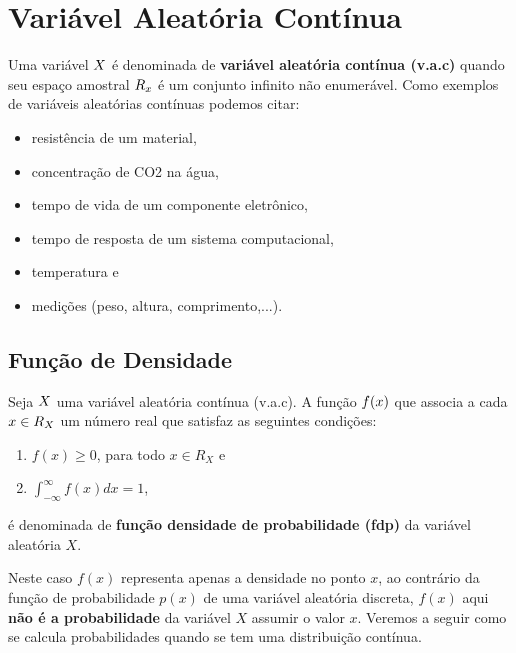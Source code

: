\documentclass[11pt]{article}
\begin{document}
\begin{flushleft}
\tableofcontents
\end{flushleft}


\justify

\section{Variável Aleatória Contínua} Uma variável $\mathnormal{X}$ é denominada de \textbf{variável aleatória contínua (v.a.c)} quando seu espaço amostral $\mathnormal{ R_x }$ é um conjunto infinito não enumerável. 
Como exemplos de variáveis aleatórias contínuas podemos citar:

\begin{itemize}
    \item resistência de um material,
    \item concentração de CO2 na água,
    \item tempo de vida de um componente eletrônico,
    \item tempo de resposta de um sistema computacional,
    \item temperatura e
    \item medições (peso, altura, comprimento,...).
\end{itemize}

\subsection{Função de Densidade}
Seja $\mathnormal{X}$ uma variável aleatória contínua (v.a.c). A função $\mathnormal{f(x)}$ que associa a cada $\mathnormal{x \in R_X}$ um número real que satisfaz as seguintes condições:
\begin{enumerate}
    \item $ f(x) \geqslant 0 $, para todo $ x \in R_X $ e
    \item $\displaystyle\int_{-\infty}^{\infty} f(x) dx = 1$,
\end{enumerate}
é denominada de \textbf{função densidade de probabilidade (fdp)} da variável aleatória $X$.

Neste caso $f(x)$ representa apenas a densidade no ponto $x$, ao contrário da função de probabilidade $p(x)$ de uma variável aleatória discreta, $f(x)$ aqui \textbf{não é a probabilidade} da variável $X$ assumir o valor $x$. Veremos a seguir como se calcula probabilidades quando se tem uma distribuição contínua.
\end{document}
